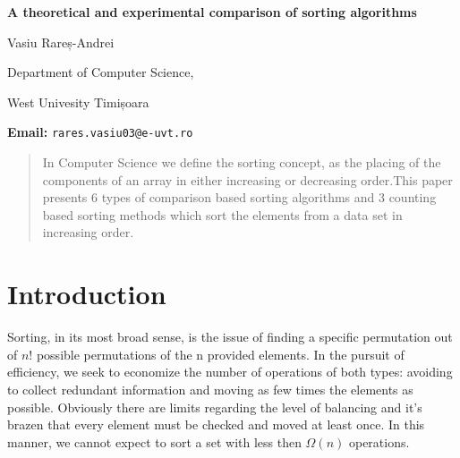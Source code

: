 \documentclass[11pt, letter paper]{article}
\begin{document}
    

    
    \begin{titlepage}
        \begin{center}
            \Large\textbf{A theoretical and experimental comparison of sorting algorithms}

            \vspace{1cm}
            \large Vasiu Rareș-Andrei
            
            \vspace{0.1cm}
            Department of Computer Science,
            
            \vspace{0.1cm}
            West Univesity Timișoara
            
            \vspace{0.1cm}
            \textbf{Email:}
            \texttt{rares.vasiu03@e-uvt.ro}
            
            \vspace{1cm}
        \end{center}

        \begin{abstract}
            In Computer Science we define the sorting concept, as the placing of the components of an array in either increasing or decreasing order.This paper presents 6 types of comparison based sorting algorithms and 3 counting based sorting methods which sort the elements from a data set in increasing order.
        \end{abstract}
    \end{titlepage}
    
    \tableofcontents 

    \newpage

\section{Introduction}
\label{sec:intro}
    Sorting, in its most broad sense, is the issue of finding a specific permutation out of $n!$ possible permutations of the n provided elements.
    In the pursuit of efficiency, we seek to economize the number of operations of both types: avoiding to collect redundant information and moving as few times the elements as possible.
    Obviously there are limits regarding the level of balancing and it’s brazen that every element must be checked and moved at least once. In this manner, we cannot expect to sort a set with less then $\Omega(n)$ operations.
\end{document}
